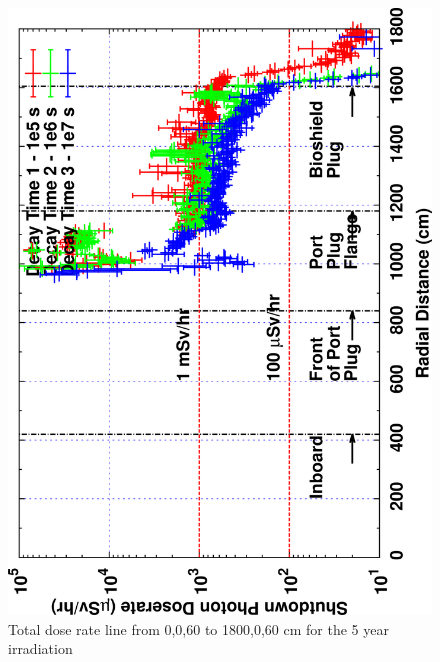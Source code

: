 \documentclass[12pt]{article}
\begin{document}
\begin{figure}[ht!]
\centering
\includegraphics[clip,scale=0.12,angle=-90]{../plots/photon_lineout/5yr/b4c_5yr.png}
\caption{Total dose rate line from 0,0,60 to 1800,0,60 cm for the 5 year irradiation}
\label{fig:photons_5y_b4c_dose}
\end{figure}
\end{document}
